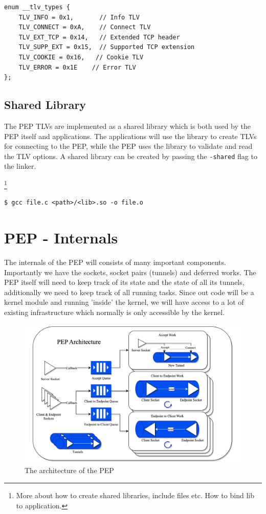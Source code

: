 \documentclass[a4paper,english, 11pt]{report}
\begin{document}
\begin{verbatim}
enum __tlv_types {
    TLV_INFO = 0x1,    	  // Info TLV
    TLV_CONNECT = 0xA,    // Connect TLV          
    TLV_EXT_TCP = 0x14,   // Extended TCP header
    TLV_SUPP_EXT = 0x15,  // Supported TCP extension
    TLV_COOKIE = 0x16,   // Cookie TLV
    TLV_ERROR = 0x1E    // Error TLV
};
\end{verbatim}

\subsection{Shared Library}
The PEP TLVs are implemented as a shared library which is both used by the PEP itself and applications. The applications will use the library to create TLVs for connecting to the PEP, while the PEP uses the library to validate and read the TLV options. 
A shared library can be created by passing the \verb|-shared| flag to the linker.

\footnote{More about how to create shared libraries, include files etc. How to bind lib to application.}

\begin{verbatim}
$ gcc file.c <path>/<lib>.so -o file.o
\end{verbatim}

\section{PEP - Internals}
The internals of the PEP will consists of many important components. Importantly we have the sockets, socket pairs (tunnels) and deferred works. The PEP itself will need to keep track of its state and the state of all its tunnels, additionally we need to keep track of all running tasks. Since out code will be a kernel module and running 'inside' the kernel, we will have access to a lot of existing infrastructure which normally is only accessible by the kernel. 

\begin{figure} %
	\centering
	\includegraphics[scale=0.35]{../diagrams/drawio/pep_architecture.png}
  	\caption{The architecture of the PEP}
  	\label{fig:pep_architecture}
\end{figure}
\end{document}
